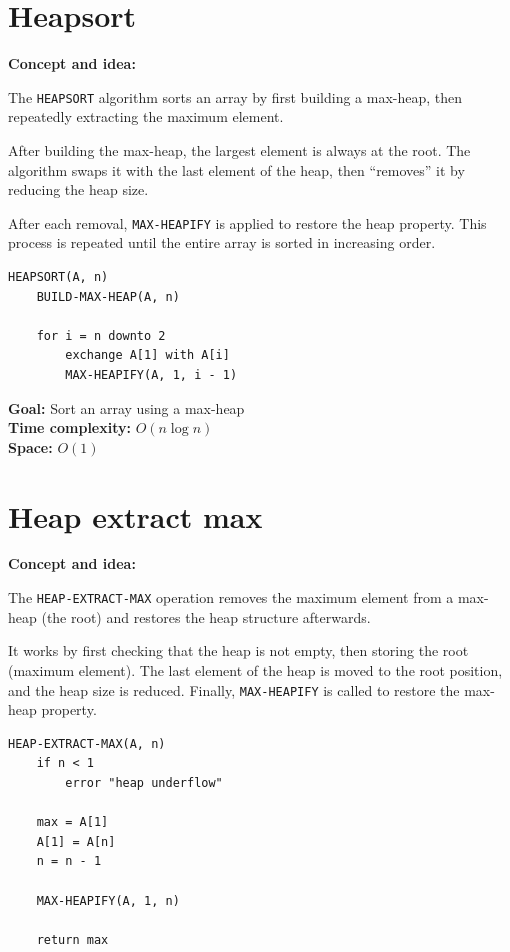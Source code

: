 \documentclass[11pt,a4paper,openany]{book}
\begin{document}
\section{Heapsort}
\textbf{Concept and idea:}

The \texttt{HEAPSORT} algorithm sorts an array by first building a max-heap, then repeatedly extracting the maximum element.

After building the max-heap, the largest element is always at the root.  
The algorithm swaps it with the last element of the heap, then “removes” it by reducing the heap size.

After each removal, \texttt{MAX-HEAPIFY} is applied to restore the heap property.  
This process is repeated until the entire array is sorted in increasing order.

\begin{lstlisting}
HEAPSORT(A, n)
    BUILD-MAX-HEAP(A, n)

    for i = n downto 2
        exchange A[1] with A[i]
        MAX-HEAPIFY(A, 1, i - 1)
\end{lstlisting}

\textbf{Goal:} Sort an array using a max-heap \\
\textbf{Time complexity:} $O(n \log n)$ \\
\textbf{Space:} $O(1)$









\vspace{2cm}







\section{Heap extract max}

\textbf{Concept and idea:}

The \texttt{HEAP-EXTRACT-MAX} operation removes the maximum element from a max-heap (the root) and restores the heap structure afterwards.

It works by first checking that the heap is not empty, then storing the root (maximum element).  
The last element of the heap is moved to the root position, and the heap size is reduced.  
Finally, \texttt{MAX-HEAPIFY} is called to restore the max-heap property.

\begin{lstlisting}
HEAP-EXTRACT-MAX(A, n)
    if n < 1
        error "heap underflow"

    max = A[1]
    A[1] = A[n]
    n = n - 1

    MAX-HEAPIFY(A, 1, n)

    return max
\end{lstlisting}
\end{document}
